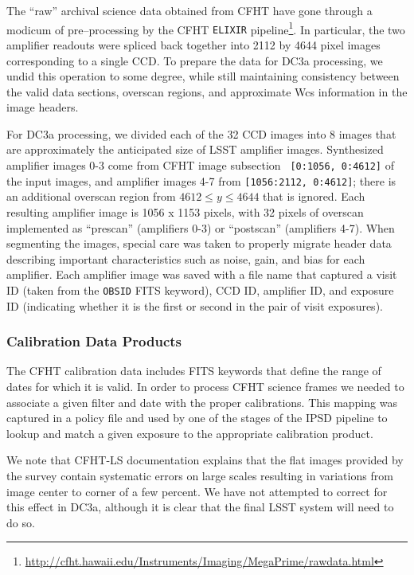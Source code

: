 The ``raw'' archival science data obtained from CFHT have gone through
a modicum of pre--processing by the CFHT {\tt ELIXIR}
pipeline\footnote{\url{http://cfht.hawaii.edu/Instruments/Imaging/MegaPrime/rawdata.html}}.
In particular, the two amplifier readouts were spliced back together
into 2112 by 4644 pixel images corresponding to a single CCD.  To
prepare the data for DC3a processing, we undid this operation to some
degree, while still maintaining consistency between the valid data
sections, overscan regions, and approximate Wcs information in the
image headers. 

For DC3a processing, we divided each of the 32 CCD images into 8 images
that are approximately the anticipated size of LSST amplifier images.
Synthesized amplifier images 0-3 come from CFHT image subsection {\tt
[0:1056, 0:4612]} of the input images, and amplifier images 4-7 from
{\tt [1056:2112, 0:4612]}; there is an additional overscan region from
$4612 \leq y \leq 4644$ that is ignored.  Each resulting amplifier
image is 1056 x 1153 pixels, with 32 pixels of overscan implemented as
``prescan'' (amplifiers 0-3) or ``postscan'' (amplifiers 4-7).  
When segmenting the images, special care was taken to properly migrate
header data describing important characteristics such as noise, gain,
and bias for each amplifier.  Each amplifier image was saved with a
file name that captured a visit ID (taken from the \texttt{OBSID} FITS
keyword), CCD ID, amplifier ID, and exposure ID (indicating whether it
is the first or second in the pair of visit exposures).  

\subsubsection{Calibration Data Products}

The CFHT calibration data includes FITS keywords that define the range
of dates for which it is valid.  In order to process CFHT science frames
we needed to associate a given filter and date with the proper
calibrations.  This mapping was captured in a policy file and used by
one of the stages of the IPSD pipeline to lookup and match a given
exposure to the appropriate calibration product.  

We note that CFHT-LS documentation explains that the flat images
provided by the survey contain systematic errors on large scales
resulting in variations from image center to corner of a few percent.
We have not attempted to correct for this effect in DC3a,  although it
is clear that the final LSST system will need to do so.


